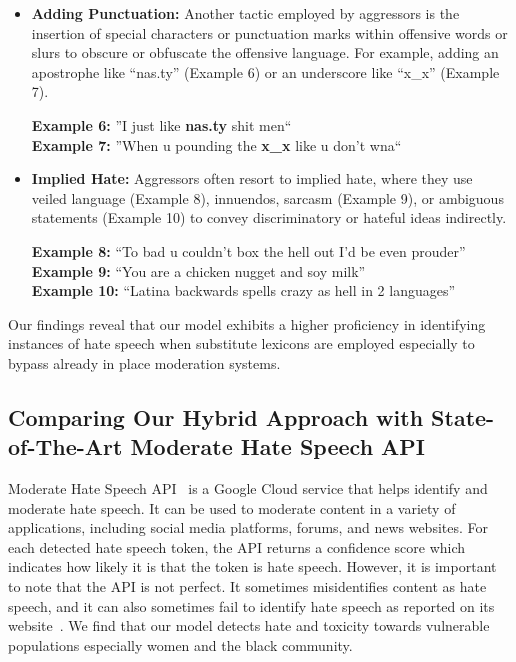 \begin{itemize}[leftmargin=*]
    \item \textbf{Adding Punctuation:} Another tactic employed by aggressors is the insertion of special characters or punctuation marks within offensive words or slurs to obscure or obfuscate the offensive language. For example, adding an apostrophe like ``nas.ty'' (Example 6) or an underscore like ``x\_x'' (Example 7).

    \vspace{0.1in}
    \begin{graybox}
    \textbf{Example 6: }''I just like \textbf{nas.ty} shit men`` \\
    \textbf{Example 7: }''When u pounding the \textbf{x\_x} like u don't wna``
    \end{graybox}
    \vspace{0.1in}

    \item \textbf{Implied Hate:} Aggressors often resort to implied hate, where they use veiled language (Example 8), innuendos, sarcasm (Example 9), or ambiguous statements (Example 10) to convey discriminatory or hateful ideas indirectly.
    \vspace{0.1in}
    \begin{graybox}
    \textbf{Example 8: }``To bad u couldn't box the hell out I'd be even prouder'' \\
    \textbf{Example 9: }``You are a chicken nugget and soy milk'' \\
    \textbf{Example 10: }``Latina backwards spells crazy as hell in 2 languages''
    \end{graybox}

\end{itemize}

Our findings reveal that our model exhibits a higher proficiency in identifying instances of hate speech when substitute lexicons are employed especially to bypass already in place moderation systems.

\subsection{Comparing Our Hybrid Approach with State-of-The-Art Moderate Hate Speech API}

Moderate Hate Speech API~\cite{moderatehatespeech} is a Google Cloud service that helps identify and moderate hate speech.
It can be used to moderate content in a variety of applications, including social media platforms, forums, and news websites.
For each detected hate speech token, the API returns a confidence score which indicates how likely it is that the token is hate speech. However, it is important to note that the API is not perfect. It sometimes misidentifies content as hate speech, and it can also sometimes fail to identify hate speech as reported on its website~\cite{moderatehatespeech}. We find that our model detects hate and toxicity towards vulnerable populations especially women and the black community.

